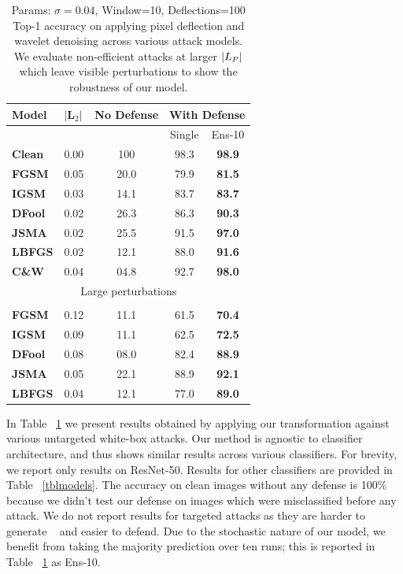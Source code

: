 \begin{table}[H]
\small
\centering
{}
\begin{tabular}{lcccc}
\textbf{Model} & \multicolumn{1}{l}{$|\boldsymbol{L}_2|$} & \multicolumn{1}{l}{\textbf{No Defense}} & \multicolumn{2}{l}{\textbf{With Defense}} \\ \hline
 & \multicolumn{1}{l}{} & \multicolumn{1}{l}{} & Single & Ens-10 \\ \cline{4-5} 
 \textbf{Clean} & 0.00 & 100 & 98.3 & \textbf{98.9} \\ \hline
\textbf{FGSM} & 0.05 & 20.0 & 79.9 & \textbf{81.5} \\
\textbf{IGSM} & 0.03 & 14.1 & 83.7 & \textbf{83.7} \\
\textbf{DFool} & 0.02 & 26.3 & 86.3 & \textbf{90.3} \\
\textbf{JSMA} & 0.02 & 25.5 & 91.5 & \textbf{97.0} \\
\textbf{LBFGS} & 0.02 & 12.1 & 88.0 & \textbf{91.6} \\
\textbf{C\&W} & 0.04 & 04.8 & 92.7 & \textbf{98.0}
\\
 \multicolumn{5}{c}{Large perturbations} \\ \hline
 &&&&\\
\textbf{FGSM} & 0.12 & 11.1 & 61.5 &  \textbf{70.4}\\
\textbf{IGSM} & 0.09 & 11.1 & 62.5 &  \textbf{72.5}\\
\textbf{DFool} & 0.08 & 08.0 & 82.4 &  \textbf{88.9}\\
\textbf{JSMA} & 0.05 & 22.1 & 88.9 &  \textbf{92.1}\\
\textbf{LBFGS} & 0.04 & 12.1 & 77.0 & \textbf{89.0} \\
\end{tabular}
\caption{ Params: $\sigma=0.04$, Window=10, Deflections=100 \\Top-1 accuracy on applying pixel deflection and wavelet denoising across various attack models. We evaluate non-efficient attacks at larger $|\boldmath{L}_P|$ which leave visible perturbations to show the robustness of our model.
 \label{tblresults}}
\end{table}
In Table ~\ref{tblresults} we present results obtained by applying our transformation against various untargeted white-box attacks. 
Our method is agnostic to classifier architecture, and thus shows similar results across various classifiers. 
For brevity, we report only results on ResNet-50. 
Results for other classifiers are provided in Table ~\ref{tblmodels}.
The accuracy on clean images without any defense is 100\% because we didn't test our defense on images which were misclassified before any attack.
We do not report results for targeted attacks as they are harder to generate ~\cite{Carlini2017TowardsET} and easier to defend. 
Due to the stochastic nature of our model, we benefit from taking the majority prediction over ten runs; this is reported in Table ~\ref{tblresults} as Ens-10.

